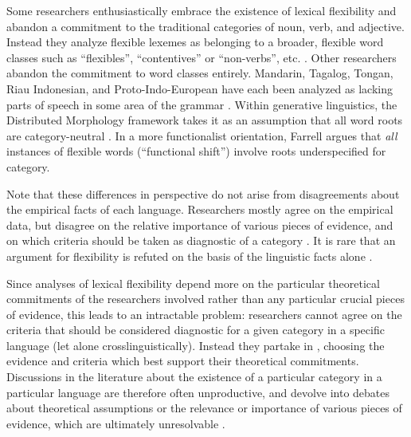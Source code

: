 Some researchers enthusiastically embrace the existence of lexical flexibility and abandon a commitment to the traditional categories of noun, verb, and adjective. Instead they analyze flexible lexemes as belonging to a broader, flexible word classes such as \enquote{flexibles}, \enquote{contentives} or \enquote{non-verbs}, etc. . Other researchers abandon the commitment to word classes entirely. Mandarin, Tagalog, Tongan, Riau Indonesian, and Proto-Indo-European have each been analyzed as lacking parts of speech in some area of the grammar . Within generative linguistics, the Distributed Morphology framework takes it as an assumption that all word roots are category-neutral . In a more functionalist orientation, Farrell  argues that \emph{all} instances of flexible words (\enquote{functional shift}) involve roots underspecified for category.

Note that these differences in perspective do not arise from disagreements about the empirical facts of each language. Researchers mostly agree on the empirical data, but disagree on the relative importance of various pieces of evidence, and on which criteria should be taken as diagnostic of a category .  It is rare that an argument for flexibility is refuted on the basis of the linguistic facts alone .

Since analyses of lexical flexibility depend more on the particular theoretical commitments of the researchers involved rather than any particular crucial pieces of evidence, this leads to an intractable problem: researchers cannot agree on the criteria that should be considered diagnostic for a given category in a specific language (let alone crosslinguistically). Instead they partake in  , choosing the evidence and criteria which best support their theoretical commitments. Discussions in the literature about the existence of a particular category in a particular language are therefore often unproductive, and devolve into debates about theoretical assumptions or the relevance or importance of various pieces of evidence, which are ultimately unresolvable .

